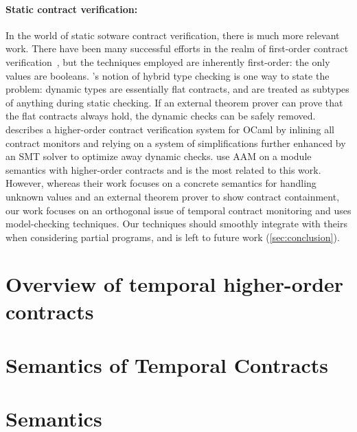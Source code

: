 \paragraph{Static contract verification:}
In the world of static sotware contract verification, there is much more relevant work.
%
There have been many successful efforts in the realm of first-order contract verification~\citep{ianjohnson:fahndrich:contracts:2011,ianjohnson:vcc:2009}, but the techniques employed are inherently first-order: the only values are booleans.
%
\citet{ianjohnson:Flanagan:2006:HTC:1111037.1111059}'s notion of hybrid type checking is one way to state the problem: dynamic types are essentially flat contracts, and are treated as subtypes of anything during static checking.
%
If an external theorem prover can prove that the flat contracts always hold, the dynamic checks can be safely removed.
%
\citet{dvanhorn:Xu2012Hybrid} describes a higher-order contract verification system for OCaml by inlining all contract monitors and relying on a system of simplifications further enhanced by an SMT solver to optimize away dynamic checks.
%
\citet{dvanhorn:TobinHochstadt2012Higherorder} use AAM on a module semantics with higher-order contracts and is the most related to this work. However, whereas their work focuses on a concrete semantics for handling unknown values and an external theorem prover to show contract containment, our work focuses on an orthogonal issue of temporal contract monitoring and uses model-checking techniques.
%
Our techniques should smoothly integrate with theirs when considering partial programs, and is left to future work (\cref{sec:conclusion}).

\section{Overview of temporal higher-order contracts}


\section{Semantics of Temporal Contracts} \label{sec:temporal-semantics}



\section{Semantics}\label{sec:technical}



